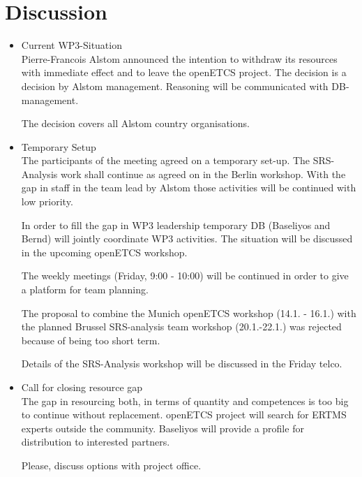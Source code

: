 \documentclass[a4paper, 11pt]{article}
\begin{document}
\section{Discussion}
\begin{itemize}
 
\item Current WP3-Situation\\
Pierre-Francois Alstom announced the intention to withdraw its resources with immediate effect and to leave the openETCS project. The decision is a decision by Alstom management. Reasoning will be communicated with DB-management.

The decision covers all Alstom country organisations.

\item Temporary Setup\\
The participants of the meeting agreed on a temporary set-up. The SRS-Analysis work shall continue as agreed on in the Berlin workshop. With the gap in staff in the team lead by Alstom those activities will be continued with low priority. 

In order to fill the gap in WP3 leadership temporary DB (Baseliyos and Bernd) will jointly coordinate WP3 activities. The situation will be discussed in the upcoming openETCS workshop.

The weekly meetings (Friday, 9:00 - 10:00) will be continued in order to give a platform for team planning. 

The proposal to combine the Munich openETCS workshop (14.1. - 16.1.) with the planned Brussel SRS-analysis team workshop (20.1.-22.1.) was rejected because of being too short term.

Details of the SRS-Analysis workshop will be discussed in the Friday telco.

\item Call for closing resource gap\\
The gap in resourcing both, in terms of quantity and competences is too big to continue without replacement. openETCS project will search for ERTMS experts outside the community. Baseliyos will provide a profile for distribution to interested partners.

Please, discuss options with project office.

\end{itemize}
\end{document}
